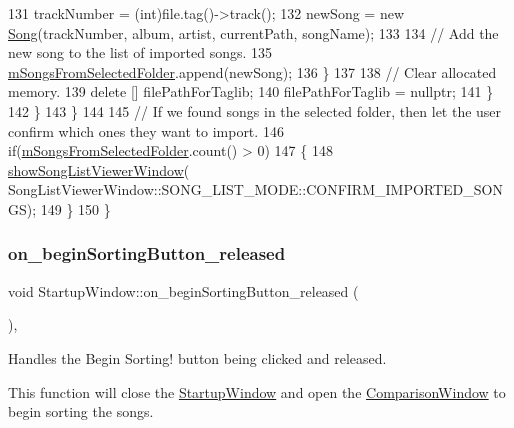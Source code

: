 \begin{DoxyCode}
131                     trackNumber = (int)file.tag()->track();
132                     newSong = \textcolor{keyword}{new} \mbox{\hyperlink{class_song}{Song}}(trackNumber, album, artist, currentPath, songName);
133 
134                     \textcolor{comment}{// Add the new song to the list of imported songs.}
135                     \mbox{\hyperlink{class_startup_window_af419f4809f6fae0b370f1d9112dae9b4}{mSongsFromSelectedFolder}}.append(newSong);
136                 \}
137 
138                 \textcolor{comment}{// Clear allocated memory.}
139                 \textcolor{keyword}{delete} [] filePathForTaglib;
140                 filePathForTaglib = \textcolor{keyword}{nullptr};
141             \}
142         \}
143     \}
144 
145     \textcolor{comment}{// If we found songs in the selected folder, then let the user confirm which ones they want to import.}
146     \textcolor{keywordflow}{if}(\mbox{\hyperlink{class_startup_window_af419f4809f6fae0b370f1d9112dae9b4}{mSongsFromSelectedFolder}}.count() > 0)
147     \{
148         \mbox{\hyperlink{class_startup_window_adc6941b3def8ed33a8925bef6ad82449}{showSongListViewerWindow}}(
      SongListViewerWindow::SONG\_LIST\_MODE::CONFIRM\_IMPORTED\_SONGS);
149     \}
150 \}
\end{DoxyCode}
\mbox{\label{class_startup_window_ad0bffaf12ad4255396ccbd709c85922f}} 
\subsubsection{\texorpdfstring{on\+\_\+begin\+Sorting\+Button\+\_\+released}{on\_beginSortingButton\_released}}
{\footnotesize\ttfamily void Startup\+Window\+::on\+\_\+begin\+Sorting\+Button\+\_\+released (\begin{DoxyParamCaption}{ }\end{DoxyParamCaption})\hspace{0.3cm}{\ttfamily [private]}, {\ttfamily [slot]}}



Handles the Begin Sorting! button being clicked and released. 

This function will close the \mbox{\hyperlink{class_startup_window}{Startup\+Window}} and open the \mbox{\hyperlink{class_comparison_window}{Comparison\+Window}} to begin sorting the songs. 

